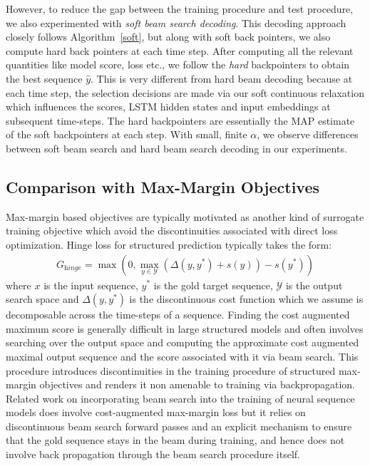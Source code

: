 \documentclass[letterpaper]{article} %
\begin{document}
However, to reduce the gap between the training procedure and test procedure, we also experimented with \emph{soft beam search decoding}. This decoding approach closely follows Algorithm~\ref{soft}, but along with soft back pointers, we also compute hard back pointers at each time step. After computing all the relevant quantities like model score, loss etc., we follow the \emph{hard} backpointers to obtain the best sequence $\hat{y}$. This is very different from hard beam decoding because at each time step, the selection decisions are made via our soft continuous relaxation which influences the scores, LSTM hidden states and input embeddings at subsequent time-steps. The hard backpointers are essentially the MAP estimate of the soft backpointers at each step. With small, finite $\alpha$, we observe differences between soft beam search and hard beam search decoding in our experiments.

\subsection{Comparison with Max-Margin Objectives \label{maxm}}
Max-margin based objectives are typically motivated as another kind of surrogate training objective which avoid the discontinuities associated with direct loss optimization. Hinge loss for structured prediction typically takes the form:
\begin{align*}
    G_{\textit{hinge}} = \max(0,\max_{y \in \mathcal{Y}}(\Delta(y,y^*)+ s(y)) - s(y^*))
\end{align*}
where $x$ is the input sequence, $y^*$ is the gold target sequence, $\mathcal{Y}$ is the output search space and $\Delta(y,y^*)$ is the discontinuous cost function which we assume is decomposable across the time-steps of a sequence. Finding the cost augmented maximum score is generally difficult in large structured models and often involves searching over the output space and computing the approximate cost augmented maximal output sequence and the score associated with it via beam search. This procedure introduces discontinuities in the training procedure of structured max-margin objectives and renders it non amenable to training via backpropagation. Related work \cite{wiseman2016sequence} on incorporating beam search into the training of neural sequence models does involve cost-augmented max-margin loss but it relies on discontinuous beam search forward passes and an explicit mechanism to ensure that the gold sequence stays in the beam during training, and hence does not involve back propagation through the beam search procedure itself.
\end{document}
